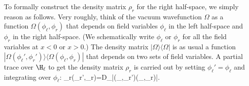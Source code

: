 \documentclass[12pt]{article}
\def\ra{\rangle}
\def\la{\langle}
\numberwithin{equation}{section}
\begin{document}
To formally construct the density matrix $\rho_r$ for the right half-space, we simply reason as follows. 
Very roughly, think of the vacuum wavefunction
$\Omega$ as a function $\Omega(\phi_\ell,\phi_r)$ that depends on field variables $\phi_\ell$ in the left half-space and $\phi_r$
in the right half-space. (We schematically write $\phi_\ell$ or $\phi_r$ for all the field variables at $x<0$ or $x>0$.)
The density matrix $|\Omega\ra\la\Omega|$ is as usual a function $|\Omega(\phi_\ell',\phi_r')\ra\la\Omega(\phi_\ell,\phi_r)|$ that
depends on two sets of field variables.  A  partial trace over $\H_\ell$ to get the density matrix $\rho_r$
 is carried out by setting  $\phi_\ell'=\phi_\ell$  and integrating over $\phi_\ell$:
\be\label{rodo}\rho_r(\phi_r',\phi_r)=\int D\phi_\ell  |\Omega(\phi_\ell,\phi_r')\ra\la\Omega(\phi_\ell,\phi_r)|. \ee  
\end{document}
